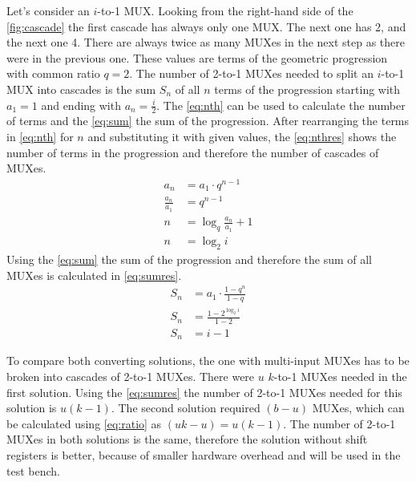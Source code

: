 Let's consider an $i$-to-1 MUX. Looking from the right-hand side of the \autoref{fig:cascade} the first cascade has always only one MUX. The next one has 2, and the next one 4. There are always twice as many MUXes in the next step as there were in the previous one. These values are terms of the geometric progression with common ratio $q=2$. The number of 2-to-1 MUXes needed to split an $i$-to-1 MUX into cascades is the sum $S_n$ of all $n$ terms of the progression starting with $a_1=1$ and ending with $a_n=\frac{i}{2}$. The \autoref*{eq:nth} can be used to calculate the number of terms and the \autoref*{eq:sum} the sum of the progression. After rearranging the terms in \autoref*{eq:nth} for $n$ and substituting it with given values, the \autoref*{eq:nthres} shows the number of terms in the progression and therefore the number of cascades of MUXes.
\begin{subequations}
\begin{align}
    a_n&=a_1\cdot q^{n-1}\label{eq:nth}\\
    \frac{a_n}{a_1} &=  q^{n-1}\\
    n &= \log_q \frac{a_n}{a_1}+1\\
    n &= \log_2 i\label{eq:nthres}
\end{align}
\end{subequations}
Using the \autoref*{eq:sum} the sum of the progression and therefore the sum of all MUXes is calculated in \autoref*{eq:sumres}.
\begin{subequations}
\begin{align}
    S_n&=a_1\cdot\frac{1-q^{n}}{1-q}\label{eq:sum}\\
    S_n&=\frac{1-2^{\log_2 i}}{1-2}\\
    S_n&=i-1\label{eq:sumres}
\end{align}
\end{subequations}

To compare both converting solutions, the one with multi-input MUXes has to be broken into cascades of 2-to-1 MUXes. There were $u$ $k$-to-1 MUXes needed in the first solution. Using the \autoref*{eq:sumres} the number of 2-to-1 MUXes needed for this solution is $u(k-1)$. The second solution required $(b-u)$ MUXes, which can be calculated using \autoref*{eq:ratio} as $(uk-u)=u(k-1)$. The number of 2-to-1 MUXes in both solutions is the same, therefore the solution without shift registers is better, because of smaller hardware overhead and will be used in the test bench.

